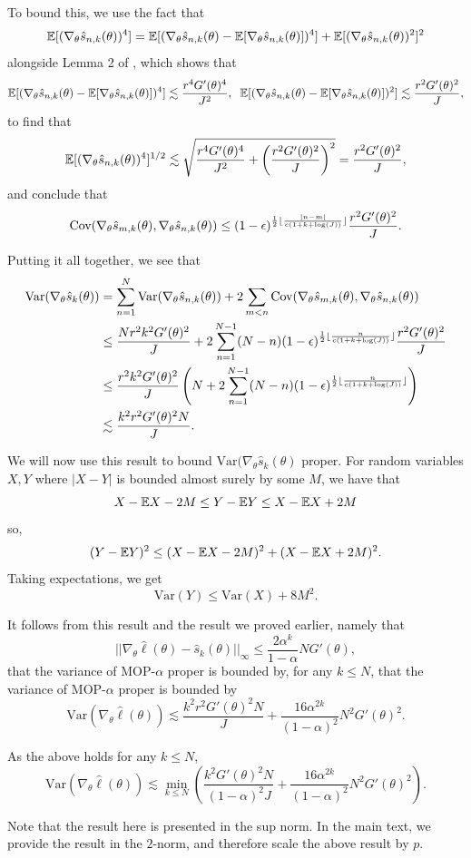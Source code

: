 \documentclass{article}
\begin{document}
To bound this, we use the fact that $$\mathbb{E}[(\nabla_\theta\hat s_{n,k}(\theta))^4] = \mathbb{E}[(\nabla_\theta\hat s_{n,k}(\theta)-\mathbb{E}[\nabla_\theta\hat s_{n,k}(\theta)])^4]+\mathbb{E}[(\nabla_\theta\hat s_{n,k}(\theta))^2]^2$$
alongside Lemma 2 of \cite{karjalainen2023}, which shows that
$$\mathbb{E}[(\nabla_\theta\hat s_{n,k}(\theta)-\mathbb{E}[\nabla_\theta\hat s_{n,k}(\theta)])^4] \lesssim \frac{r^4G'(\theta)^4}{J^2}, \;\; \mathbb{E}[(\nabla_\theta\hat s_{n,k}(\theta)-\mathbb{E}[\nabla_\theta\hat s_{n,k}(\theta)])^2] \lesssim \frac{r^2G'(\theta)^2}{J},$$
to find that 
$$\mathbb{E}[(\nabla_\theta\hat s_{n,k}(\theta))^4]^{1/2} \lesssim  \sqrt{\frac{r^4G'(\theta)^4}{J^2}+\left(\frac{r^2G'(\theta)^2}{J}\right)^2} = \frac{r^2G'(\theta)^2}{J},$$
and conclude that 
$$\text{Cov}(\nabla_\theta\hat s_{m,k}(\theta), \nabla_\theta\hat s_{n,k}(\theta)) \leq (1-\epsilon)^{\frac{1}{2}\lfloor \frac{|n-m|}{c(1+k+\log(J))} \rfloor}\frac{r^2G'(\theta)^2}{J}.$$


Putting it all together, we see that
\begin{align*}
    \text{Var}(\nabla_\theta \hat s_{k}(\theta)) &= \sum_{n=1}^N \text{Var}(\nabla_\theta\hat s_{n,k}(\theta)) + 2\sum_{m<n} \text{Cov}(\nabla_\theta\hat s_{m,k}(\theta),\nabla_\theta\hat s_{n,k}(\theta))\\
    &\leq \frac{Nr^2k^2G'(\theta)^2}{J} + 2\sum_{n=1}^{N-1} (N-n)(1-\epsilon)^{\frac{1}{2}\lfloor \frac{n}{c(1+k+\log(J))} \rfloor}\frac{r^2G'(\theta)^2}{J} \\
    &\leq \frac{r^2k^2G'(\theta)^2}{J} \left(N + 2\sum_{n=1}^{N-1} (N-n) (1-\epsilon)^{\frac{1}{2}\lfloor \frac{n}{c(1+k+\log(J))} \rfloor}\right) \\
    &\lesssim \frac{k^2r^2G'(\theta)^2N}{J}.
\end{align*}

We will now use this result to bound $\text{Var}(\nabla_\theta \hat s_k(\theta)$ proper. For random variables $X,Y$ where $|X-Y|$ is bounded almost surely by some $M$, we have that 
$$X-\mathbb{E} X - 2M \leq Y - \mathbb{E} Y \leq X - \mathbb{E} X + 2M$$
so,
$$(Y-\mathbb{E} Y)^2 \leq (X-\mathbb{E} X - 2M)^2 + (X-\mathbb{E} X +2M)^2.$$
Taking expectations, we get
$$\text{Var}(Y) \leq \text{Var}(X) + 8M^2.$$

It follows from this result and the result we proved earlier, namely that
$$||\nabla_\theta\hat\ell(\theta) - \hat s_k(\theta)||_\infty \leq \frac{2\alpha^k}{1-\alpha}NG'(\theta),$$
that the variance of MOP-$\alpha$ proper is bounded by, for any $k \leq N$,
that the variance of MOP-$\alpha$ proper is bounded by
$$\text{Var}(\nabla_\theta \hat\ell(\theta)) \lesssim \frac{k^2r^2G'(\theta)^2N}{J} + \frac{16\alpha^{2k}}{(1-\alpha)^2}N^2G'(\theta)^2.$$

As the above holds for any $k \leq N$,
$$\text{Var}(\nabla_\theta \hat\ell(\theta)) \lesssim \min_{k\leq N} \left(\frac{k^2G'(\theta)^2N}{(1-\alpha)^2J} + \frac{16\alpha^{2k}}{(1-\alpha)^2}N^2G'(\theta)^2 \right).$$

Note that the result here is presented in the sup norm. In the main text, we provide the result in the $2$-norm, and therefore scale the above result by $p$. 
\end{document}
